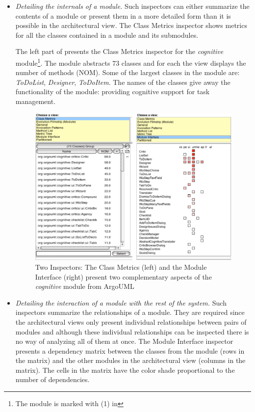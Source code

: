 \documentclass[preprint,12pt]{elsarticle}
\newcommand{\cd}[1]{{\em{#1}}}
\begin{document}
\begin{itemize}

\item {\em Detailing the internals of a module.} Such inspectors can either summarize the contents of a module or present them in a more detailed form than it is possible in the architectural view. The Class Metrics inspector shows metrics for all the classes contained in a module and its submodules. 

The left part of  presents the Class Metrics inspector for the \cd{cognitive} module\footnote{The module is marked with (1) in }. The module abstracts 73 classes and for each the view displays the number of methods (NOM). Some of the largest classes in the module are: \cd{ToDoList}, \cd{Designer}, \cd{ToDoItem}. %
The names of the classes give away the functionality of the module: providing cognitive support for task management.


\begin{figure}[h]
\begin{center}
\includegraphics[width=\linewidth]{images/ModuleDetails}
\caption{Two Inspectors: The Class Metrics (left) and the Module Interface (right) present two complementary aspects of the {\em cognitive} module from ArgoUML} 
\end{center}
\end{figure}

\item {\em Detailing the interaction of a module with the rest of the system.} Such inspectors summarize the relationships of a module. They are required since the architectural views only present individual relationships between pairs of modules and although these individual relationships can be inspected there is no way of analyzing all of them at once. The Module Interface inspector presents a dependency matrix between the classes from the module (rows in the matrix) and the other modules in the architectural view (columns in the matrix). The cells in the matrix have the color shade proportional to the number of dependencies.


\end{itemize}
\end{document}
